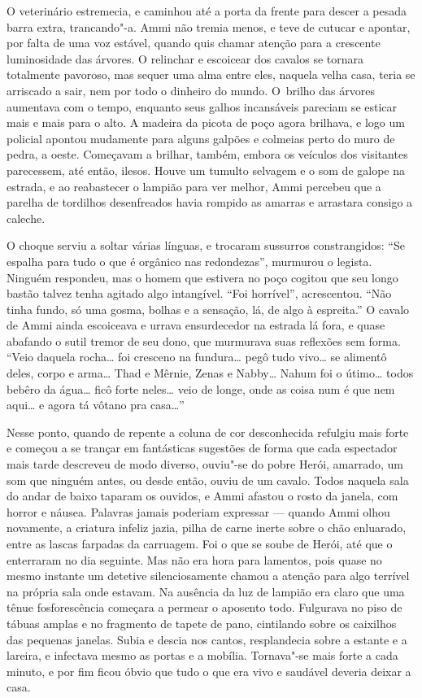 O veterinário estremecia, e caminhou até a porta da frente para descer a
pesada barra extra, trancando"-a. Ammi não tremia menos, e teve de
cutucar e apontar, por falta de uma voz estável, quando quis chamar
atenção para a crescente luminosidade das árvores. O relinchar e
escoicear dos cavalos se tornara totalmente pavoroso, mas sequer uma
alma entre eles, naquela velha casa, teria se arriscado a sair, nem por
todo o dinheiro do mundo. O~brilho das árvores aumentava com o tempo,
enquanto seus galhos incansáveis pareciam se esticar mais e mais para o
alto. A madeira da picota de poço agora brilhava, e logo um policial
apontou mudamente para alguns galpões e colmeias perto do muro de pedra,
a oeste. Começavam a brilhar, também, embora os veículos dos visitantes
parecessem, até então, ilesos. Houve um tumulto selvagem e o som de
galope na estrada, e ao reabastecer o lampião para ver melhor, Ammi
percebeu que a parelha de tordilhos desenfreados havia rompido as
amarras e arrastara consigo a caleche.

O choque serviu a soltar várias línguas, e trocaram sussurros
constrangidos: ``Se espalha para tudo o que é orgânico nas redondezas'',
murmurou o legista. Ninguém respondeu, mas o homem que estivera no poço
cogitou que seu longo bastão talvez tenha agitado algo intangível. ``Foi
horrível'', acrescentou. ``Não tinha fundo, só uma gosma, bolhas e a
sensação, lá, de algo à espreita.'' O cavalo de Ammi ainda escoiceava e
urrava ensurdecedor na estrada lá fora, e quase abafando o sutil tremor
de seu dono, que murmurava suas reflexões sem forma. ``Veio daquela
rocha\ldots{} foi cresceno na fundura\ldots{} pegô tudo vivo\ldots{} se
alimentô deles, corpo e arma\ldots{} Thad e Mêrnie, Zenas e Nabby\ldots{}
Nahum foi o útimo\ldots{} todos bebêro da água\ldots{} ficô forte neles\ldots{} veio de longe, onde as coisa num é que nem aqui\ldots{} e agora tá
vôtano pra casa\ldots{}''

Nesse ponto, quando de repente a coluna de cor desconhecida refulgiu
mais forte e começou a se trançar em fantásticas sugestões de forma que
cada espectador mais tarde descreveu de modo diverso, ouviu"-se do pobre
Herói, amarrado, um som que ninguém antes, ou desde então, ouviu de um
cavalo. Todos naquela sala do andar de baixo taparam os ouvidos, e Ammi
afastou o rosto da janela, com horror e náusea. Palavras jamais poderiam
expressar --- quando Ammi olhou novamente, a criatura infeliz jazia,
pilha de carne inerte sobre o chão enluarado, entre as lascas farpadas
da carruagem. Foi o que se soube de Herói, até que o enterraram no dia
seguinte. Mas não era hora para lamentos, pois quase no mesmo instante
um detetive silenciosamente chamou a atenção para algo terrível na
própria sala onde estavam. Na ausência da luz de lampião era claro que
uma tênue fosforescência começara a permear o aposento todo. Fulgurava
no piso de tábuas amplas e no fragmento de tapete de pano, cintilando
sobre os caixilhos das pequenas janelas. Subia e descia nos cantos,
resplandecia sobre a estante e a lareira, e infectava mesmo as portas e
a mobília. Tornava"-se mais forte a cada minuto, e por fim ficou óbvio
que tudo o que era vivo e saudável deveria deixar a casa.

